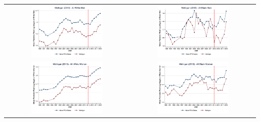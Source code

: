 \documentclass[11pt]{article}
\begin{document}
{\pagebreak
\begin{landscape}
\begin{table}[h!]
    \centering
    \label{fig:pta_mi}
    \begin{tabular}{c c}
          \includegraphics[width = 0.6\textwidth, keepaspectratio]{figures/pta/fin_wm_mi.png} & \includegraphics[width = 0.6\textwidth, keepaspectratio]{figures/pta/fin_bm_mi.png} \\
          \includegraphics[width = 0.6\textwidth, keepaspectratio]{figures/pta/fin_wf_mi.png} & \includegraphics[width = 0.6\textwidth, keepaspectratio]{figures/pta/fin_bf_mi.png}
    \end{tabular}
\end{table}
\end{landscape}

}
\end{document}
